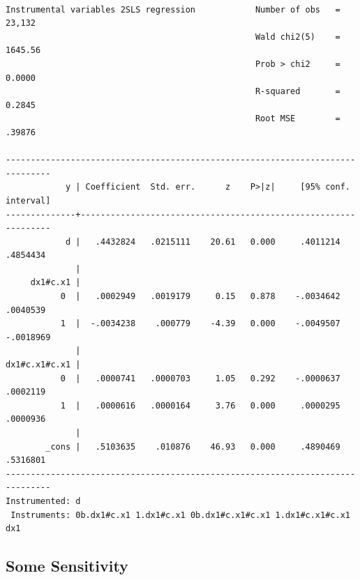 \documentclass[
  letterpaper,
  DIV=11,
  numbers=noendperiod]{scrartcl}
\begin{document}
\begin{verbatim}

Instrumental variables 2SLS regression            Number of obs   =     23,132
                                                  Wald chi2(5)    =    1645.56
                                                  Prob > chi2     =     0.0000
                                                  R-squared       =     0.2845
                                                  Root MSE        =     .39876

-------------------------------------------------------------------------------
            y | Coefficient  Std. err.      z    P>|z|     [95% conf. interval]
--------------+----------------------------------------------------------------
            d |   .4432824   .0215111    20.61   0.000     .4011214    .4854434
              |
     dx1#c.x1 |
           0  |   .0002949   .0019179     0.15   0.878    -.0034642    .0040539
           1  |  -.0034238    .000779    -4.39   0.000    -.0049507   -.0018969
              |
dx1#c.x1#c.x1 |
           0  |   .0000741   .0000703     1.05   0.292    -.0000637    .0002119
           1  |   .0000616   .0000164     3.76   0.000     .0000295    .0000936
              |
        _cons |   .5103635    .010876    46.93   0.000     .4890469    .5316801
-------------------------------------------------------------------------------
Instrumented: d
 Instruments: 0b.dx1#c.x1 1.dx1#c.x1 0b.dx1#c.x1#c.x1 1.dx1#c.x1#c.x1 dx1
\end{verbatim}

\subsection{Some Sensitivity}\label{some-sensitivity}
\end{document}
